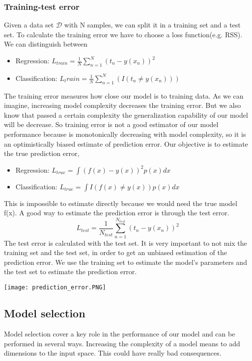 \documentclass[main.tex]{subfiles}
\begin{document}
\subsubsection{Training-test error}
Given a data set $\mathcal{D}$ with N samples, we can split it in a training set and a test set.
To calculate the training error we have to choose a loss function(e.g. RSS).
We can distinguish between 
\begin{itemize}
    \item Regression: $L_{train} = \frac{1}{N} \sum_{n=1}^N (t_n - y(x_n))^2$
    \item Classification: $L_train = \frac{1}{N} \sum_{n=1}^N (I(t_n \neq y(x_n)))$
\end{itemize}
The training error measures how close our model is to training data. As we can imagine, increasing model complexity decreases the training error. But we also know that passed a certain complexity the generalization capability of our model will be decrease. So training error is not a good estimator of our model performance because is monotonically decreasing with model complexity, so it is an optimistically biased estimate of prediction error.
Our objective is to estimate the true prediction error,
\begin{itemize}
    \item Regression: $L_{true} = \int (f(x) - y(x))^2 p(x)dx$
    \item Classification: $L_{true} = \int I(f(x) \neq y(x)) p(x)dx$
\end{itemize}
This is impossible to estimate directly because we would need the true model f(x). A good way to estimate the prediction error is through the test error.
\begin{equation}
    L_{test} = \frac{1}{N_{test}} \sum_{n=1}^{N_{test}} (t_n - y(x_n))^2
\end{equation}
The test error is calculated with the test set. It is very important to not mix the training set and the test set, in order to get an unbiased estimation of the prediction error.
We use the training set to estimate the model's parameters and the test set to estimate the prediction error.
\begin{center}
    \texttt{[image: prediction\_error.PNG]}
\end{center}

\newpage
\subsection{Model selection}
Model selection cover a key role in the performance of our model and can be performed in several ways. 
Increasing the complexity of a model means to add dimensions to the input space. This could have really bad consequences.
\end{document}
